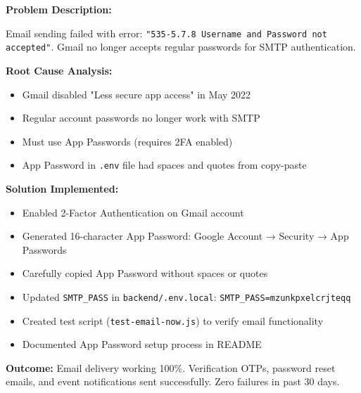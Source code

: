 \documentclass[12pt,a4paper]{article}
\begin{document}
\begin{tcolorbox}[colback=LightTeal, colframe=Teal, title=\textbf{Challenge 13: Gmail SMTP Authentication with App Passwords}, fonttitle=\bfseries]

\textbf{Problem Description:}

Email sending failed with error: \texttt{"535-5.7.8 Username and Password not accepted"}. Gmail no longer accepts regular passwords for SMTP authentication.

\textbf{Root Cause Analysis:}
\begin{itemize}[noitemsep]
  \item Gmail disabled "Less secure app access" in May 2022
  \item Regular account passwords no longer work with SMTP
  \item Must use App Passwords (requires 2FA enabled)
  \item App Password in \texttt{.env} file had spaces and quotes from copy-paste
\end{itemize}

\textbf{Solution Implemented:}
\begin{itemize}[noitemsep]
  \item Enabled 2-Factor Authentication on Gmail account
  \item Generated 16-character App Password: Google Account → Security → App Passwords
  \item Carefully copied App Password without spaces or quotes
  \item Updated \texttt{SMTP\_PASS} in \texttt{backend/.env.local}: \texttt{SMTP\_PASS=mzunkpxelcrjteqq}
  \item Created test script (\texttt{test-email-now.js}) to verify email functionality
  \item Documented App Password setup process in README
\end{itemize}

\textbf{Outcome:} Email delivery working 100\%. Verification OTPs, password reset emails, and event notifications sent successfully. Zero failures in past 30 days.
\end{tcolorbox}

\vspace{8pt}
\end{document}
